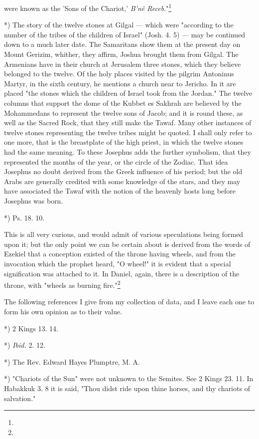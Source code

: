 \documentclass[a4paper, 11pt, oneside, polutonikogreek, english]{article}
\begin{document}
were known as the 'Sons of the Chariot,' \emph{B'nê Receb}."\footnote{}

*) The story of the twelve stones at Gilgal --- which were "according to the number of the tribes of the children of Israel" (Josh. 4. 5) --- may be continued down to a much later date. The Samaritans show them at the present day on Mount Gerizim, whither, they affirm, Joshua brought them from Gilgal. The Armenians have in their church at Jerusalem three stones, which they believe belonged to the twelve. Of the holy places visited by the pilgrim Antoninus Martyr, in the sixth century, he mentions a church near to Jericho. In it are placed "the stones which the children of Israel took from the Jordan." The twelve columns that support the dome of the Kubbet es Sakhrah are believed by the Mohammedans to represent the twelve sons of Jacob; and it is round these, as well as the Sacred Rock, that they still make the Tawaf. Many other instances of twelve stones representing the twelve tribes might be quoted. I shall only refer to one more, that is the breastplate of the high priest, in which the twelve stones had the same meaning. To these Josephus adds the further symbolism, that they represented the months of the year, or the circle of the Zodiac. That idea Josephus no doubt derived from the Greek influence of his period; but the old Arabs are generally credited with some knowledge of the stars, and they may have associated the Tawaf with the notion of the heavenly hosts long before Josephus was born.


*) Ps. 18. 10.

This is all very curious, and would admit of various speculations being formed upon it; but the only point we can be certain about is derived from the words of Ezekiel that a conception existed of the throne having wheels, and from the invocation which the prophet heard, "O wheel!" it is evident that a special signification was attached to it. In Daniel, again, there is a description of the throne, with "wheels as burning fire."\footnote{}

The following references I give from my collection of data, and I leave each one to form his own opinion as to their value.

*) 2 Kings 13. 14.

*) \emph{Ibid.} 2. 12.

*) The Rev. Edward Hayes Plumptre, M. A.

*) "Chariots of the Sun" were not unknown to the Semites. See 2 Kings 23. 11. In Habakkuk 3. 8 it is said, "Thou didst ride upon thine horses, and thy chariots of salvation."
\end{document}
